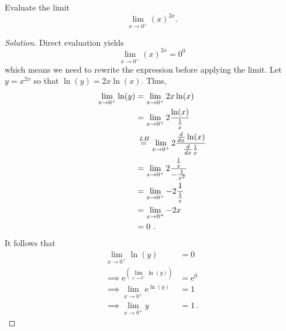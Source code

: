 \documentclass[compacto,10pt,comentarios]{aleph-notas}
\newcommand*\Heq{\ensuremath{\overset{\kern2pt LH}{=}}}
\begin{document}
\begin{ejer}
    Evaluate the limit
    $$
        \lim_{x \to 0^{+}} \left( x \right)^{2x}.
    $$
\end{ejer}
\begin{proof}[Solution]
    Direct evaluation yields
    $$
        \lim_{x \to 0^{+}} \left( x \right)^{2x}
        = 0^{0}
    $$
    which means we need to rewrite the expression before applying the limit. Let $y = x^{2x}$ so that $\ln(y) = 2x \ln(x)$. Thus,
    \begin{align*}
        \lim_{x \to 0^{+}} \ln(y)
        & = \lim_{x \to 0^{+}} 2x \ln(x) \\
        & = \lim_{x \to 0^{+}} 2 \frac{\ln(x)}{\frac{1}{x}} \\
        & \Heq \lim_{x \to 0^{+}} 2 \frac{\frac{d}{dx} \ln(x)}{\frac{d}{dx} \frac{1}{x}} \\
        & = \lim_{x \to 0^{+}} 2 \frac{\frac{1}{x}}{-\frac{1}{x^2}} \\
        & = \lim_{x \to 0^{+}} -2 \frac{1}{\frac{1}{x}} \\ 
        & = \lim_{x \to 0^{+}} -2 x \\
        & = 0 ~ .
    \end{align*}
    It follows that
    \begin{align*}
        \lim_{x \to 0^{+}} \ln(y) & = 0 \\
        \implies \mathrm{e}^{\left( \displaystyle \lim_{x \to 0^{+}} \ln(y) \right)} & = \mathrm{e}^{0} \\
        \implies \lim_{x \to 0^{+}} \mathrm{e}^{\ln(y)} & = 1 \\
        \implies \lim_{x \to 0^{+}} y & = 1 ~ .
    \end{align*}
\end{proof}
\end{document}
